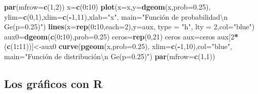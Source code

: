 \documentclass[]{book}
\newenvironment{Shaded}{\begin{snugshade}}{\end{snugshade}}
\newcommand{\CharTok}[1]{\textcolor[rgb]{0.31,0.60,0.02}{#1}}
\newcommand{\DataTypeTok}[1]{\textcolor[rgb]{0.13,0.29,0.53}{#1}}
\newcommand{\DecValTok}[1]{\textcolor[rgb]{0.00,0.00,0.81}{#1}}
\newcommand{\FloatTok}[1]{\textcolor[rgb]{0.00,0.00,0.81}{#1}}
\newcommand{\KeywordTok}[1]{\textcolor[rgb]{0.13,0.29,0.53}{\textbf{#1}}}
\newcommand{\NormalTok}[1]{#1}
\newcommand{\OperatorTok}[1]{\textcolor[rgb]{0.81,0.36,0.00}{\textbf{#1}}}
\newcommand{\StringTok}[1]{\textcolor[rgb]{0.31,0.60,0.02}{#1}}
\begin{document}
\begin{Shaded}
\begin{Highlighting}[]
\KeywordTok{par}\NormalTok{(}\DataTypeTok{mfrow=}\KeywordTok{c}\NormalTok{(}\DecValTok{1}\NormalTok{,}\DecValTok{2}\NormalTok{))}
\NormalTok{x=}\KeywordTok{c}\NormalTok{(}\DecValTok{0}\OperatorTok{:}\DecValTok{10}\NormalTok{)}
\KeywordTok{plot}\NormalTok{(}\DataTypeTok{x=}\NormalTok{x,}\DataTypeTok{y=}\KeywordTok{dgeom}\NormalTok{(x,}\DataTypeTok{prob=}\FloatTok{0.25}\NormalTok{),}
  \DataTypeTok{ylim=}\KeywordTok{c}\NormalTok{(}\DecValTok{0}\NormalTok{,}\DecValTok{1}\NormalTok{),}\DataTypeTok{xlim=}\KeywordTok{c}\NormalTok{(}\OperatorTok{-}\DecValTok{1}\NormalTok{,}\DecValTok{11}\NormalTok{),}\DataTypeTok{xlab=}\StringTok{"x"}\NormalTok{,}
  \DataTypeTok{main=}\StringTok{"Función de probabilidad}\CharTok{\textbackslash{}n}\StringTok{ Ge(p=0.25)"}\NormalTok{)}
\KeywordTok{lines}\NormalTok{(}\DataTypeTok{x=}\KeywordTok{rep}\NormalTok{(}\DecValTok{0}\OperatorTok{:}\DecValTok{10}\NormalTok{,}\DataTypeTok{each=}\DecValTok{2}\NormalTok{),}\DataTypeTok{y=}\NormalTok{aux, }\DataTypeTok{type =} \StringTok{"h"}\NormalTok{, }\DataTypeTok{lty =} \DecValTok{2}\NormalTok{,}\DataTypeTok{col=}\StringTok{"blue"}\NormalTok{)}
\NormalTok{aux0=}\KeywordTok{dgeom}\NormalTok{(}\KeywordTok{c}\NormalTok{(}\DecValTok{0}\OperatorTok{:}\DecValTok{10}\NormalTok{),}\DataTypeTok{prob=}\FloatTok{0.25}\NormalTok{)}
\NormalTok{ceros=}\KeywordTok{rep}\NormalTok{(}\DecValTok{0}\NormalTok{,}\DecValTok{21}\NormalTok{)}
\NormalTok{ceros}
\NormalTok{aux=ceros}
\NormalTok{aux[}\DecValTok{2}\OperatorTok{*}\NormalTok{(}\KeywordTok{c}\NormalTok{(}\DecValTok{1}\OperatorTok{:}\DecValTok{11}\NormalTok{))]<-aux0}
\KeywordTok{curve}\NormalTok{(}\KeywordTok{pgeom}\NormalTok{(x,}\DataTypeTok{prob=}\FloatTok{0.25}\NormalTok{),}
  \DataTypeTok{xlim=}\KeywordTok{c}\NormalTok{(}\OperatorTok{-}\DecValTok{1}\NormalTok{,}\DecValTok{10}\NormalTok{),}\DataTypeTok{col=}\StringTok{"blue"}\NormalTok{,}
  \DataTypeTok{main=}\StringTok{"Función de distribución\textbackslash{}n Ge(p=0.25)"}\NormalTok{)}
\KeywordTok{par}\NormalTok{(}\DataTypeTok{mfrow=}\KeywordTok{c}\NormalTok{(}\DecValTok{1}\NormalTok{,}\DecValTok{1}\NormalTok{))}
\end{Highlighting}
\end{Shaded}

\hypertarget{los-gruxe1ficos-con-r}{%
\subsection{Los gráficos con R}\label{los-gruxe1ficos-con-r}}
\end{document}
